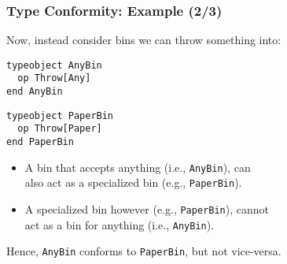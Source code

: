 \begin{frame}[fragile]

\frametitle{Type Conformity: Example (2/3)}

Now, instead consider bins we can throw something into:

\begin{center}
\begin{minipage}{0.4\textwidth}
\begin{lstlisting}
typeobject AnyBin
  op Throw[Any]
end AnyBin
\end{lstlisting}
\end{minipage}\quad%
\begin{minipage}{0.4\textwidth}
\begin{lstlisting}
typeobject PaperBin
  op Throw[Paper]
end PaperBin
\end{lstlisting}
\end{minipage}
\end{center}

\begin{itemize}

\item A bin that accepts anything (i.e., \texttt{AnyBin}), can\\ also
act as a specialized bin (e.g., \texttt{PaperBin}).

\item A specialized bin however (e.g., \texttt{PaperBin}), cannot\\
act as a bin for anything (i.e., \texttt{AnyBin}).

\end{itemize}

Hence, \texttt{AnyBin} conforms to \texttt{PaperBin}, but not vice-versa.

\end{frame}

